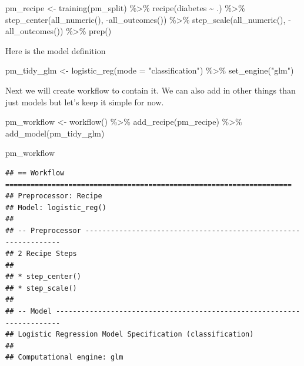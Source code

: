 \documentclass[
]{article}
\newenvironment{Shaded}{\begin{snugshade}}{\end{snugshade}}
\newcommand{\AttributeTok}[1]{\textcolor[rgb]{0.77,0.63,0.00}{#1}}
\newcommand{\FunctionTok}[1]{\textcolor[rgb]{0.00,0.00,0.00}{#1}}
\newcommand{\NormalTok}[1]{#1}
\newcommand{\OtherTok}[1]{\textcolor[rgb]{0.56,0.35,0.01}{#1}}
\newcommand{\SpecialCharTok}[1]{\textcolor[rgb]{0.00,0.00,0.00}{#1}}
\newcommand{\StringTok}[1]{\textcolor[rgb]{0.31,0.60,0.02}{#1}}
\begin{document}
\begin{Shaded}
\begin{Highlighting}[]
\NormalTok{pm\_recipe }\OtherTok{\textless{}{-}} \FunctionTok{training}\NormalTok{(pm\_split) }\SpecialCharTok{\%\textgreater{}\%}
  \FunctionTok{recipe}\NormalTok{(diabetes }\SpecialCharTok{\textasciitilde{}}\NormalTok{ .) }\SpecialCharTok{\%\textgreater{}\%}
  \FunctionTok{step\_center}\NormalTok{(}\FunctionTok{all\_numeric}\NormalTok{(), }\SpecialCharTok{{-}}\FunctionTok{all\_outcomes}\NormalTok{()) }\SpecialCharTok{\%\textgreater{}\%}
  \FunctionTok{step\_scale}\NormalTok{(}\FunctionTok{all\_numeric}\NormalTok{(), }\SpecialCharTok{{-}}\FunctionTok{all\_outcomes}\NormalTok{()) }\SpecialCharTok{\%\textgreater{}\%}
  \FunctionTok{prep}\NormalTok{()}
\end{Highlighting}
\end{Shaded}

Here is the model definition

\begin{Shaded}
\begin{Highlighting}[]
\NormalTok{pm\_tidy\_glm }\OtherTok{\textless{}{-}} \FunctionTok{logistic\_reg}\NormalTok{(}\AttributeTok{mode =} \StringTok{"classification"}\NormalTok{) }\SpecialCharTok{\%\textgreater{}\%}
  \FunctionTok{set\_engine}\NormalTok{(}\StringTok{"glm"}\NormalTok{) }
\end{Highlighting}
\end{Shaded}

Next we will create workflow to contain it. We can also add in other
things than just models but let's keep it simple for now.

\begin{Shaded}
\begin{Highlighting}[]
\NormalTok{pm\_workflow }\OtherTok{\textless{}{-}} \FunctionTok{workflow}\NormalTok{() }\SpecialCharTok{\%\textgreater{}\%}
  \FunctionTok{add\_recipe}\NormalTok{(pm\_recipe) }\SpecialCharTok{\%\textgreater{}\%}
  \FunctionTok{add\_model}\NormalTok{(pm\_tidy\_glm) }
\end{Highlighting}
\end{Shaded}

\begin{Shaded}
\begin{Highlighting}[]
\NormalTok{pm\_workflow}
\end{Highlighting}
\end{Shaded}

\begin{verbatim}
## == Workflow ====================================================================
## Preprocessor: Recipe
## Model: logistic_reg()
## 
## -- Preprocessor ----------------------------------------------------------------
## 2 Recipe Steps
## 
## * step_center()
## * step_scale()
## 
## -- Model -----------------------------------------------------------------------
## Logistic Regression Model Specification (classification)
## 
## Computational engine: glm
\end{verbatim}
\end{document}
